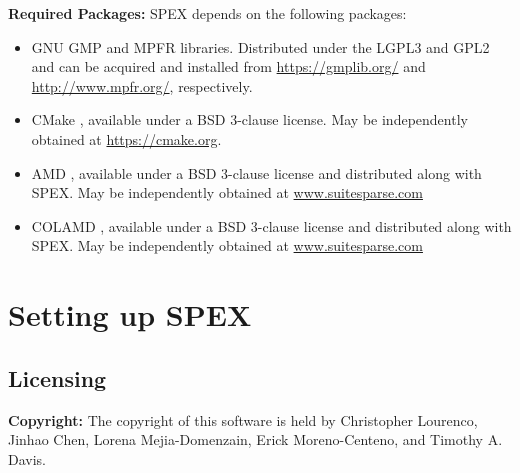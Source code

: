 \documentclass[12pt,oneside]{book}
\theoremstyle{definition}
\begin{document}
\noindent \textbf{Required Packages:} SPEX depends on the following packages:
\begin{itemize} 
    \item GNU GMP \cite{granlund2015gnu} and MPFR \cite{fousse2007mpfr} libraries. Distributed under the LGPL3 and GPL2 and can be acquired and installed from \url{https://gmplib.org/} and \url{http://www.mpfr.org/}, respectively.

    \item CMake \cite{hoffman2003cmake}, available under a BSD 3-clause license. May be independently obtained at \url{https://cmake.org}.
    
    \item AMD \cite{amestoy1996approximate,amestoy2004algorithmamd}, available under a BSD 3-clause license and distributed along with SPEX. May be independently obtained at \url{www.suitesparse.com}
    
    \item COLAMD \cite{davis2004column,davis2004algorithmcolamd}, available under a BSD 3-clause license and distributed along with SPEX. May be independently obtained at \url{www.suitesparse.com}

\end{itemize}



\chapter{Setting up SPEX}\vspace{-0.75in}

\section{Licensing} \label{s:util:licensing}
\textbf{Copyright:} The copyright of this software is held by Christopher Lourenco, Jinhao Chen, Lorena Mejia-Domenzain, Erick Moreno-Centeno, and Timothy A. Davis.\\
\end{document}
